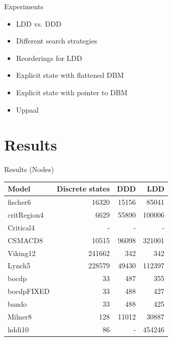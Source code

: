 \begin{frame}{Experiments}
\begin{itemize}
	\item LDD vs. DDD
	\item Different search strategies
	\item Reorderings for LDD
	\item Explicit state with flattened DBM
	\item Explicit state with pointer to DBM
	\item Uppaal
\end{itemize}
\end{frame}

\section{Results}

\begin{frame}{Results (Nodes)}

\begin{table}
    \begin{tabular}{|l|r|r|r|}
    \hline
     Model      & Discrete states & DDD     & LDD         \\ \hline
    fischer6    & 16320           & 15156   & 85041       \\
    critRegion4 & 6629            & 55890   & 100006      \\
    Critical4   & -               & -       & -           \\
    CSMACD8     & 10515           & 96098   & 321001      \\
    Viking12    & 241662          & 342     & 342         \\
    Lynch5      & 228579          & 49430   & 112397      \\
    bocdp       & 33              & 487     & 355         \\
    bocdpFIXED  & 33              & 488     & 427         \\
    bando       & 33              & 488     & 425         \\
    Milner8     & 128             & 11012   & 30887       \\
    hddi10      & 86              & -       & 454246      \\ \hline
    \end{tabular}
\end{table}

\end{frame}

